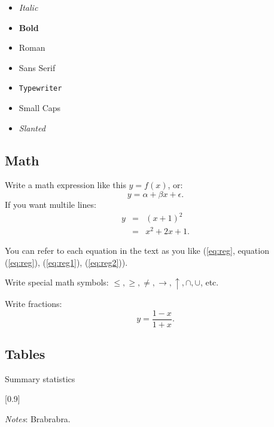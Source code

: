 \documentclass[11pt]{article}
\begin{document}
\begin{itemize}
	\item {\it Italic}
	\item {\bf Bold}
	\item {\rm Roman}
	\item {\sf Sans Serif}
	\item {\tt Typewriter}
	\item {\sc Small Caps}
	\item {\sl Slanted}
\end{itemize}

\subsection{Math}

Write a math expression like this $y = f(x)$, or:
\begin{equation}
	y = \alpha + \beta x + \epsilon. \label{eq:reg} %
\end{equation}
If you want multile lines:
\begin{eqnarray}
	y &=& (x+1)^2 \label{eq:reg1} \nonumber \\ %
  	 &=& x^2 + 2x + 1. \label{eq:reg2} 
\end{eqnarray}

You can refer to each equation in the text as you like (\autoref{eq:reg}, equation (\ref{eq:reg}), (\ref{eq:reg1}), (\ref{eq:reg2})).

Write special math symbols: $\leq, \geq, \neq, \rightarrow, \uparrow, \cap, \cup$, etc.

Write fractions:
\begin{equation}
	y = \frac{1 - x}{1 + x}.
\end{equation}

\subsection{Tables}

\begin{table}[H] %
	\caption{Summary statistics}
	\begin{center}
	\scalebox{0.9}[0.9]{
		
	}
	\end{center}
	{\footnotesize {\it Notes}: Brabrabra.} \label{tab:sum_stat1}
\end{table}


 
\end{document}
